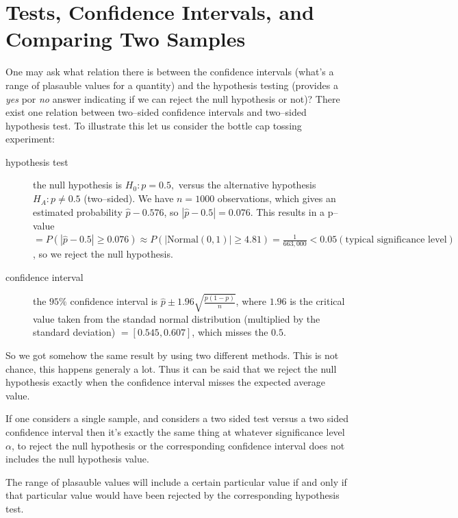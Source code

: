 \chapter*{Tests, Confidence Intervals, and Comparing Two Samples}

\setcounter{section}{0}
\renewcommand*{\theHsection}{ch6.\the\value{section}}

One may ask what relation there is between the confidence intervals (what's a
range of plasauble values for a quantity) and the hypothesis testing (provides a
\emph{yes} por \emph{no} answer indicating if we can reject the null hypothesis
or not)? There exist one relation between two--sided confidence intervals and
two--sided hypothesis test. To illustrate this let us consider the bottle cap
tossing experiment:

\begin{description}
	\item[hypothesis test] the null hypothesis is $H_0: p=0.5,$ versus the
	      alternative hypothesis $H_A: p \neq 0.5$ (two--sided). We have $n=1000$
	      observations, which gives an estimated probability $\hat{p}-0.576$, so
	      $|\hat{p}-0.5|=0.076$. This results in a p--value $=P(|\hat{p}-0.5| \geq
		      0.076) \approx P(|\mbox{Normal}(0,1)| \geq 4.81) = \frac{1}{663,000} <
		      0.05 (\mbox{typical significance level})$, so we reject the null hypothesis.

	\item[confidence interval] the $95\%$ confidence interval is $\hat{p} \pm
		      1.96 \sqrt{\frac{p(1-p)}{n}}$, where $1.96$ is the critical value
	      taken from the standad normal distribution (multiplied by the standard
	      deviation) $= [0.545, 0.607]$, which misses the $0.5$.
\end{description}

So we got somehow the same result by using two different methods. This is not
chance, this happens generaly a lot. Thus it can be said that we reject the null
hypothesis exactly when the confidence interval misses the expected average
value.

If one considers a single sample, and considers a two sided test versus a two
sided confidence interval then it's exactly the same thing at whatever
significance level $\alpha$, to reject the null hypothesis or the corresponding
confidence interval does not includes the null hypothesis value.

The range of plasauble values  will include a certain particular value if and
only if that particular value would have been rejected by the corresponding
hypothesis test.


